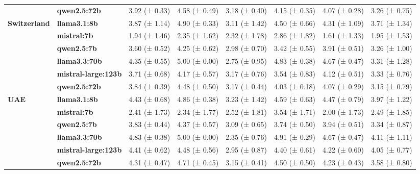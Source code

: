 \begin{longtable}{llllllll}
\textbf{} & \textbf{qwen2.5:72b} & 3.92 (± 0.33) & 4.58 (± 0.49) & 3.18 (± 0.40) & 4.15 (± 0.35) & 4.07 (± 0.28) & 3.26 (± 0.75) \\
\cline{1-8}
\multirow[t]{6}{*}{\textbf{Switzerland}} & \textbf{llama3.1:8b} & 3.87 (± 1.14) & 4.90 (± 0.33) & 3.11 (± 1.42) & 4.50 (± 0.66) & 4.31 (± 1.09) & 3.71 (± 1.34) \\
\textbf{} & \textbf{mistral:7b} & 1.94 (± 1.46) & 2.35 (± 1.62) & 2.32 (± 1.78) & 2.86 (± 1.82) & 1.61 (± 1.33) & 1.95 (± 1.53) \\
\textbf{} & \textbf{qwen2.5:7b} & 3.60 (± 0.52) & 4.25 (± 0.62) & 2.98 (± 0.70) & 3.42 (± 0.55) & 3.91 (± 0.51) & 3.26 (± 1.00) \\
\textbf{} & \textbf{llama3.3:70b} & 4.35 (± 0.55) & 5.00 (± 0.00) & 2.75 (± 0.95) & 4.83 (± 0.38) & 4.67 (± 0.47) & 3.31 (± 1.28) \\
\textbf{} & \textbf{mistral-large:123b} & 3.71 (± 0.68) & 4.17 (± 0.57) & 3.17 (± 0.76) & 3.54 (± 0.83) & 4.12 (± 0.51) & 3.33 (± 0.76) \\
\textbf{} & \textbf{qwen2.5:72b} & 3.84 (± 0.39) & 4.48 (± 0.50) & 3.17 (± 0.44) & 4.03 (± 0.18) & 4.07 (± 0.29) & 3.15 (± 0.79) \\
\cline{1-8}
\multirow[t]{6}{*}{\textbf{UAE}} & \textbf{llama3.1:8b} & 4.43 (± 0.68) & 4.86 (± 0.38) & 3.23 (± 1.42) & 4.59 (± 0.63) & 4.47 (± 0.79) & 3.97 (± 1.22) \\
\textbf{} & \textbf{mistral:7b} & 2.41 (± 1.73) & 2.34 (± 1.77) & 2.52 (± 1.81) & 3.54 (± 1.71) & 2.00 (± 1.73) & 2.49 (± 1.85) \\
\textbf{} & \textbf{qwen2.5:7b} & 3.83 (± 0.44) & 4.37 (± 0.57) & 3.09 (± 0.65) & 3.74 (± 0.50) & 3.94 (± 0.51) & 3.34 (± 0.87) \\
\textbf{} & \textbf{llama3.3:70b} & 4.83 (± 0.38) & 5.00 (± 0.00) & 2.35 (± 0.76) & 4.91 (± 0.29) & 4.67 (± 0.47) & 4.11 (± 1.11) \\
\textbf{} & \textbf{mistral-large:123b} & 4.41 (± 0.62) & 4.48 (± 0.56) & 2.95 (± 0.87) & 4.40 (± 0.61) & 4.22 (± 0.60) & 4.05 (± 0.77) \\
\textbf{} & \textbf{qwen2.5:72b} & 4.31 (± 0.47) & 4.71 (± 0.45) & 3.15 (± 0.41) & 4.50 (± 0.50) & 4.23 (± 0.43) & 3.58 (± 0.80) \\
\cline{1-8}
\end{longtable}
